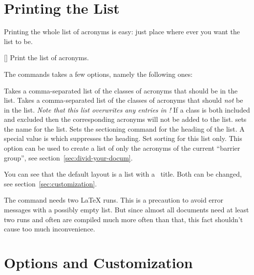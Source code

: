 \documentclass{acro-manual}
\begin{document}
\section{Printing the List}\label{sec:print_lists}
Printing the whole list of acronyms is easy: just place 
where ever you want the list to be.
\begin{commands}
  []
    Print the list of acronyms.
\end{commands}
The commands takes a few options, namely the following ones:
\begin{options}
    Takes a comma-separated list of the classes of acronyms that should be in
    the list.
    Takes a comma-separated list of the classes of acronyms that should
    \emph{not} be in the list.  \emph{Note that this list overwrites any
      entries in !} If a class is both included and
    excluded then the corresponding acronyms will not be added to the list.
    sets the name for the list.
    Sets the sectioning command for the heading of the list.  A special value
    is  which suppresses the heading. 
    Set sorting for this list only.
    This option can be used to create a list of only the
    acronyms of the current \enquote{barrier group}, see
    section~\ref{sec:divid-your-docum}.
\end{options}
\begin{example}
  \printacronyms[exclude-classes=city]
 
  \printacronyms[include-classes=city,name={City Acronyms}]
\end{example}

You can see that the default layout is a  list with a
\sarg\ title.  Both can be changed, see
section~\vref{sec:customization}.

The command  needs two \LaTeX{} runs.  This is a precaution
to avoid error messages with a possibly empty list.  But since almost all
documents need at least two runs and often are compiled much more often than
that, this fact shouldn't cause too much inconvenience.

\section{Options and Customization}\label{sec:customization}
\end{document}
